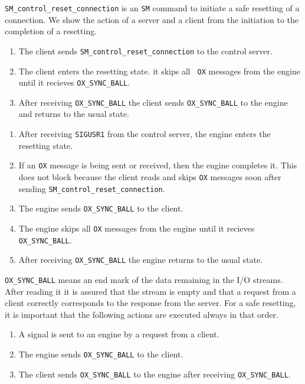 {\tt SM\_control\_reset\_connection} is an {\tt SM} command to
initiate a safe resetting of a connection. We show the action of 
a server and a client from the initiation to the completion of
a resetting.

\noindent
{}

\begin{enumerate}
\item The client sends {\tt SM\_control\_reset\_connection} to the
control server.
\item The client enters the resetting state. it skips all {\tt
OX} messages from the engine until it recieves {\tt OX\_SYNC\_BALL}.
\item After receiving {\tt OX\_SYNC\_BALL} the client sends 
{\tt OX\_SYNC\_BALL} to the engine and returns to the usual state.
\end{enumerate}

\noindent
{}

\begin{enumerate}
\item After receiving {\tt SIGUSR1} from the control server,
the engine enters the resetting state.
\item If an {\tt OX} message is being sent or received, then
the engine completes it. This does not block because
the client reads and skips {\tt OX} messages soon after sending
{\tt SM\_control\_reset\_connection}.
\item The engine sends {\tt OX\_SYNC\_BALL} to the client.
\item The engine skips all {\tt OX} messages from the engine until it
recieves {\tt OX\_SYNC\_BALL}.
\item After receiving {\tt OX\_SYNC\_BALL} the engine returns to the
usual state.
\end{enumerate}

{\tt OX\_SYNC\_BALL} means an end mark of the data remaining in the
I/O streams. After reading it it is assured that the stream is empty
and that a request from a client correctly corresponds to the response
from the server.  For a safe resetting, it is important that the
following actions are executed always in that order.

\begin{enumerate}
\item A signal is sent to an engine by a request from a client.
\item The engine sends {\tt OX\_SYNC\_BALL} to the client.
\item The client sends {\tt OX\_SYNC\_BALL} to the engine after
receiving {\tt OX\_SYNC\_BALL}.
\end{enumerate}

